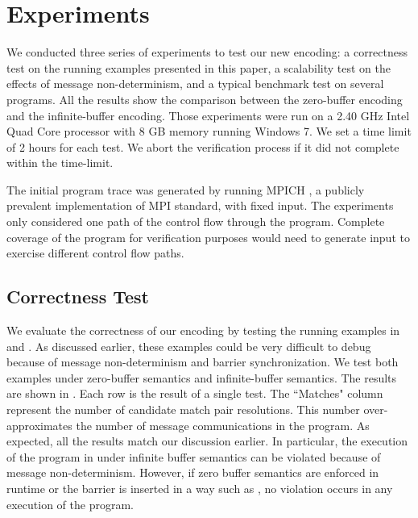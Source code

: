 \section{Experiments}
We conducted three series of experiments to test our new encoding: a correctness test on the running examples presented in this paper, a scalability test on the effects of message non-determinism, and a typical benchmark test on several programs. All the results show the comparison between the zero-buffer encoding and the infinite-buffer encoding.  Those experiments were run on a 2.40 GHz Intel Quad Core processor with 8 GB memory running Windows 7. We set a time limit of 2 hours for each test. We abort the verification process if it did not complete within the time-limit. 

The initial program trace was generated by running MPICH \cite{mpich}, a publicly prevalent implementation of MPI standard, with fixed input. The experiments only considered one path of the control flow through the program. Complete coverage of the program for verification purposes would need to generate input to exercise different control flow paths. 

\subsection{Correctness Test}
We evaluate the correctness of our encoding by testing the running examples in  and . As discussed earlier, these examples could be very difficult to debug because of message non-determinism and barrier synchronization. We test both examples under zero-buffer semantics and infinite-buffer semantics. The results are shown in . Each row is the result of a single test. The ``Matches" column represent the number of candidate match pair resolutions.  This number over-approximates the number of message communications in the program. As expected, all the results match our discussion earlier. In particular, the execution of the program in  under infinite buffer semantics can be violated because of message non-determinism. However, if zero buffer semantics are enforced in runtime or the barrier is inserted in a way such as , no violation occurs in any execution of the program. 

